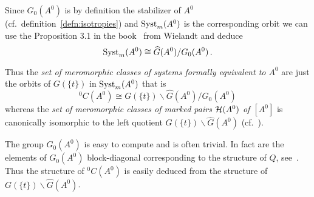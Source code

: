 \begin{lem}
  Since $G_0(A^0)$ is by definition the stabilizer of $A^0$ (cf.\
  definition~\ref{defn:isotropies}) and $\operatorname{Syst}_m(A^0)$ is the corresponding
  orbit we can use the Proposition 3.1 in the
  book~\cite{wielandt1964finite} from Wielandt and deduce
  \[
    \operatorname{Syst}_m(A^0)\cong \widehat G(A^0)/G_0(A^0) \,.
  \]
  \begin{s-cor}\label{cor:isomorphyOfClassfset}
    Thus the \emph{set of meromorphic classes of systems formally equivalent
    to $A^0$} are just the orbits of $G(\!\{t\}\!)$ in $\operatorname{Syst}_m(A^0)$ that is
    \[
      {}^0C(A^0)\cong G(\!\{t\}\!)\backslash\hat G(A^0)/G_0(A^0)
    \]
    whereas the \emph{set of meromorphic classes of marked pairs $\mathcal{H}(A^0)$
    of $[A^0]$} is canonically isomorphic to the left quotient
    $G(\!\{t\}\!)\backslash\hat G(A^0)$ (cf.\ \cite[Lem.1.17]{thboalch}).
  \end{s-cor}
\end{lem}
The group $G_0(A^0)$ is easy to compute and is often trivial. In fact are the
elements of $G_0(A^0)$ block-diagonal corresponding to the structure of $Q$,
see~\cite[77]{Loday2014}.
Thus the structure of ${}^0C(A^0)$ is easily deduced from the structure of
$G(\!\{t\}\!)\backslash\hat G(A^0)$.

